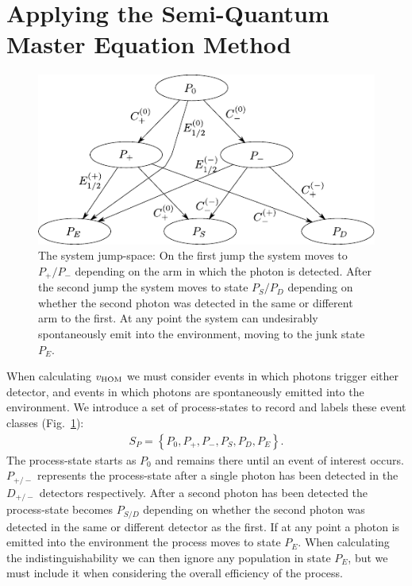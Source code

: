 \section{Applying the Semi-Quantum Master Equation Method}

\begin{figure}[htb]
  \begin{center}
  \includegraphics[width=12cm]{assets/subspace_partition.pdf}
\end{center}
  \caption{The system jump-space: On the first jump the system moves to $P_+ / P_-$ depending on the arm in which the photon is detected. After the second jump the system moves to state $P_S / P_D$ depending on whether the second photon was detected in the same or different arm to the first. At any point the system can undesirably spontaneously emit into the environment, moving to the junk state $P_E$.}
  \label{subspace_partition}
\end{figure}

When calculating $v_{\rm HOM}$ we must consider events in which photons trigger either detector, and events in which photons are spontaneously emitted into the environment. We introduce a set of process-states to record and labels these event classes (Fig.~\ref{subspace_partition}):
\begin{eqnarray}
  S_P = \left\{ P_0, P_+, P_-, P_S, P_D, P_E \right\}.
\end{eqnarray}
The process-state starts as $P_0$ and remains there until an event of interest occurs. $P_{+/-}$ represents the process-state after a single photon has been detected in the $D_{+/-}$ detectors respectively. After a second photon has been detected the process-state becomes $P_{S/D}$ depending on whether the second photon was detected in the same or different detector as the first. If at any point a photon is emitted into the environment the process moves to state $P_E$. When calculating the indistinguishability we can then ignore any population in state $P_E$, but we must include it when considering the overall efficiency of the process.

